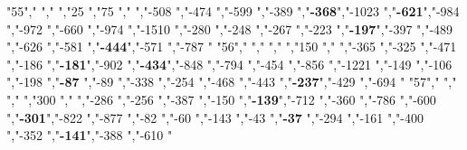 "55","        ","     ","25  ","75  ","     ","-508          ","-474          ","-599          ","-389          ","\textbf{-368}","-1023         ","\textbf{-621}","-984          ","-972          ","-660          ","-974          ","-1510         ","-280          ","-248          ","-267          ","-223          ","\textbf{-197}","-397          ","-489          ","-626          ","-581          ","\textbf{-444}","-571          ","-787          "
"56","        ","     ","    ","150 ","     ","-365          ","-325          ","-471          ","-186          ","\textbf{-181}","-902          ","\textbf{-434}","-848          ","-794          ","-454          ","-856          ","-1221         ","-149          ","-106          ","-198          ","\textbf{-87} ","-89           ","-338          ","-254          ","-468          ","-443          ","\textbf{-237}","-429          ","-694          "
"57","        ","     ","    ","300 ","     ","-286          ","-256          ","-387          ","-150          ","\textbf{-139}","-712          ","-360          ","-786          ","-600          ","\textbf{-301}","-822          ","-877          ","-82           ","-60           ","-143          ","-43           ","\textbf{-37} ","-294          ","-161          ","-400          ","-352          ","\textbf{-141}","-388          ","-610          "
